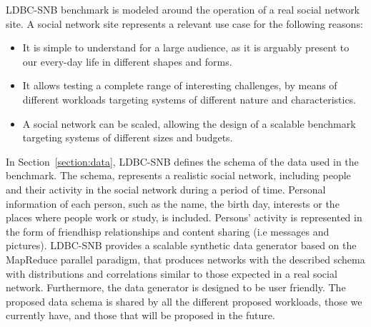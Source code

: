 LDBC-SNB benchmark is modeled around the operation of a real social network
site. A social network site represents a relevant use case for the following
reasons:

\begin{itemize}
    \item It is simple to understand for a large audience, as it is 
        arguably present to our every-day life in different shapes and forms.  
    \item It allows testing a complete range of interesting
        challenges, by means of different workloads targeting systems of
        different nature and characteristics.
    \item A social network can be scaled, allowing the design of a
        scalable benchmark targeting systems of different sizes and budgets.
\end{itemize}

In Section~\ref{section:data}, LDBC-SNB defines the schema of the data used in
the benchmark. The schema, represents a realistic social network, including
people and their activity in the social network during a period of time.
Personal information of each person, such as the name, the birth day, interests
or the places where people work or study, is included. Persons' activity is
represented in the form of friendhisp relationships and content sharing (i.e
messages and pictures). LDBC-SNB provides a scalable synthetic data generator
based on the MapReduce parallel paradigm, that produces networks with the
described schema with distributions and correlations similar to those expected
in a real social network. Furthermore, the data generator is designed to be
user friendly. The proposed data schema is shared by all the different proposed
workloads, those we currently have, and those that will be proposed in the future.

